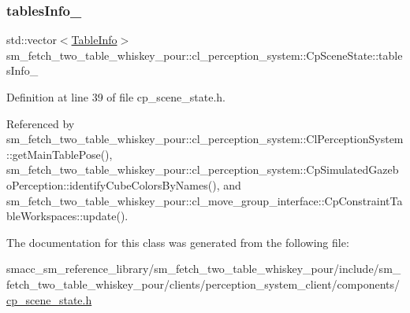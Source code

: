 \subsubsection{\texorpdfstring{tables\+Info\+\_\+}{tablesInfo\_}}
{\footnotesize\ttfamily std\+::vector$<$\hyperlink{structsm__fetch__two__table__whiskey__pour_1_1cl__perception__system_1_1TableInfo}{Table\+Info}$>$ sm\+\_\+fetch\+\_\+two\+\_\+table\+\_\+whiskey\+\_\+pour\+::cl\+\_\+perception\+\_\+system\+::\+Cp\+Scene\+State\+::tables\+Info\+\_\+}



Definition at line 39 of file cp\+\_\+scene\+\_\+state.\+h.



Referenced by sm\+\_\+fetch\+\_\+two\+\_\+table\+\_\+whiskey\+\_\+pour\+::cl\+\_\+perception\+\_\+system\+::\+Cl\+Perception\+System\+::get\+Main\+Table\+Pose(), sm\+\_\+fetch\+\_\+two\+\_\+table\+\_\+whiskey\+\_\+pour\+::cl\+\_\+perception\+\_\+system\+::\+Cp\+Simulated\+Gazebo\+Perception\+::identify\+Cube\+Colors\+By\+Names(), and sm\+\_\+fetch\+\_\+two\+\_\+table\+\_\+whiskey\+\_\+pour\+::cl\+\_\+move\+\_\+group\+\_\+interface\+::\+Cp\+Constraint\+Table\+Workspaces\+::update().



The documentation for this class was generated from the following file\+:\begin{DoxyCompactItemize}
\item 
smacc\+\_\+sm\+\_\+reference\+\_\+library/sm\+\_\+fetch\+\_\+two\+\_\+table\+\_\+whiskey\+\_\+pour/include/sm\+\_\+fetch\+\_\+two\+\_\+table\+\_\+whiskey\+\_\+pour/clients/perception\+\_\+system\+\_\+client/components/\hyperlink{sm__fetch__two__table__whiskey__pour_2include_2sm__fetch__two__table__whiskey__pour_2clients_2pe1d884b2ae39657d62d2e1b48dc324a87}{cp\+\_\+scene\+\_\+state.\+h}\end{DoxyCompactItemize}
